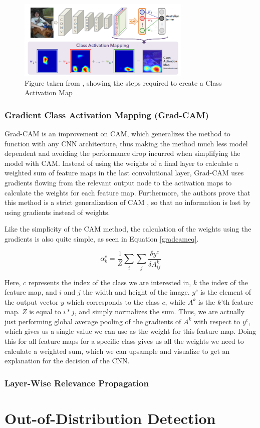\documentclass[conference]{IEEEtran}
\begin{document}
\begin{figure}[h]
\centerline{\includegraphics[width=3.25in]{figure/cam.png}}
\caption{Figure taken from \cite{cam}, showing the steps required to create a Class Activation Map}
\label{camimg}
\end{figure}

\subsubsection{Gradient Class Activation Mapping (Grad-CAM)}

Grad-CAM \cite{gradcam} is an improvement on CAM, which generalizes the method to function with any CNN architecture, thus making the method much less model dependent and avoiding the performance drop incurred when simplifying the model with CAM. Instead of using the weights of a final layer to calculate a weighted sum of feature maps in the last convolutional layer, Grad-CAM uses gradients flowing from the relevant output node to the activation maps to calculate the weights for each feature map. Furthermore, the authors prove that this method is a strict generalization of CAM \cite[5]{gradcam}, so that no information is lost by using gradients instead of weights.

Like the simplicity of the CAM method, the calculation of the weights using the gradients is also quite simple, as seen in Equation \ref{gradcameq}.

\begin{equation}
\alpha^c_k = \frac{1}{Z} \sum_i \sum_j \frac{\delta y^c}{\delta A^k_{ij}}
\label{gradcameq}
\end{equation}

Here, $c$ represents the index of the class we are interested in, $k$ the index of the feature map, and $i$ and $j$ the width and height of the image. $y^c$ is the element of the output vector $y$ which corresponds to the class $c$, while $A^k$ is the $k$'th feature map. $Z$ is equal to $i * j$, and simply normalizes the sum. Thus, we are actually just performing global average pooling of the gradients of $A^k$ with respect to $y^c$, which gives us a single value we can use as the weight for this feature map. Doing this for all feature maps for a specific class gives us all the weights we need to calculate a weighted sum, which we can upsample and visualize to get an explanation for the decision of the CNN.

\subsubsection{Layer-Wise Relevance Propagation}

\subsubsection{}

\section{Out-of-Distribution Detection}



\end{document}
